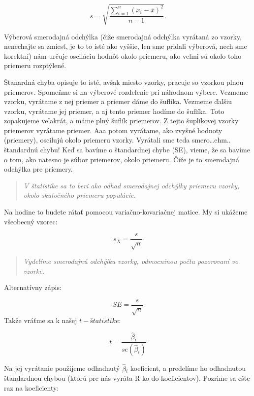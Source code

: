 \documentclass[]{article}
\newenvironment{Shaded}{\begin{snugshade}}{\end{snugshade}}
\newcommand{\KeywordTok}[1]{\textcolor[rgb]{0.13,0.29,0.53}{\textbf{#1}}}
\newcommand{\NormalTok}[1]{#1}
\newcommand{\OperatorTok}[1]{\textcolor[rgb]{0.81,0.36,0.00}{\textbf{#1}}}
\begin{document}
\[s = \sqrt{\frac{\sum_{i=1}^{n} \left(x_{i} - \bar{x}\right)^{2}} {n-1}}.\]

Výberová smerodajná odchýlka (čiže smerodajná odchýlka vyrátaná zo
vzorky, nenechajte sa zmiesť, je to to isté ako vyššie, len sme pridali
výberová, nech sme korektní) nám určuje osciláciu hodnôt okolo priemeru,
ako veľmi sú okolo toho priemeru rozptýlené.

Štanardná chyba opisuje to isté, avšak miesto vzorky, pracuje so vzorkou
plnou priemerov. Spomeňme si na výberové rozdelenie pri náhodnom výbere.
Vezmeme vzorku, vyrátame z nej priemer a priemer dáme do šuflíka.
Vezmeme ďalšiu vzorku, vyrátame jej priemer, a aj tento priemer hodíme
do šuflíka. Toto zopakujeme veľakrát, a máme plný šuflík priemerov. Z
tejto šuplíkovej vzorky priemerov vyrátame priemer. Aaa potom vyrátame,
ako zvyšné hodnoty (priemery), oscilujú okolo priemeru vzorky. Vyrátali
sme teda smero\ldots ehm.. štandardnú chybu! Keď sa bavíme o štandardnej
chybe (SE), vieme, že sa bavíme o tom, ako natesno je súbor priemerov,
okolo priemeru. Čiže je to smerodajná odchýlka pre priemery.

\begin{quote}
\emph{V štatistike sa to beri ako odhad smerodajnej odchýlky priemeru
vzorky, okolo skutočného priemeru populácie.}
\end{quote}

Na hodine to budete rátať pomocou variačno-kovariačnej matice. My si
ukážeme všeobecný vzorec:

\[s_{\bar{X}} = \frac{s}{\sqrt{n}}\]

\begin{quote}
\emph{Vydelíme smerodajnú odchýlku vzorky, odmocninou počtu pozorovaní
vo vzorke.}
\end{quote}

Alternatívny zápis:

\[SE = \frac{s}{\sqrt{n}}\] Takže vráťme sa k našej \(t-štatistike\):

\[t = \frac{\hat\beta{}_i}{se(\hat\beta{}_i)}\]

Na jej vyrátanie použijeme odhadnutý \(\hat\beta{}_i\) koeficient, a
predelíme ho odhadnutou štandardnou chybou (ktorú pre nás vyráta R-ko do
koeficientov). Pozrime sa ešte raz na koeficienty:

\begin{Shaded}
\end{Shaded}
\end{document}
